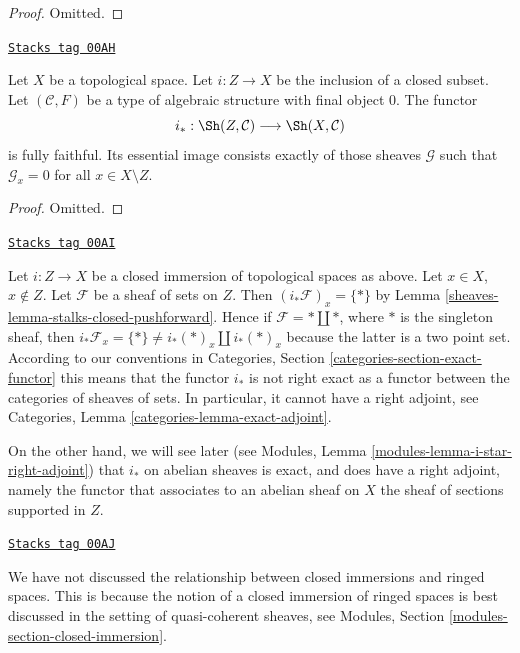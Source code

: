 \begin{proof}
Omitted.
\end{proof}

\begin{lemma}
\label{sheaves-lemma-equivalence-categories-closed-structures}
\href{https://stacks.math.columbia.edu/tag/00AH}{\texttt{Stacks tag 00AH}}

Let $X$ be a topological space.
Let $i : Z \to X$ be the inclusion of a closed subset.
Let $(\mathcal{C}, F)$ be a type of algebraic structure
with final object $0$. The functor
$$
i_* : \Sh(Z, \mathcal{C}) \longrightarrow \Sh(X, \mathcal{C})
$$
is fully faithful. Its essential image consists exactly
of those sheaves $\mathcal{G}$ such that
$\mathcal{G}_x = 0$ for all $x \in X \setminus Z$.
\end{lemma}

\begin{proof}
Omitted.
\end{proof}

\begin{remark}
\label{sheaves-remark-i-star-not-exact}
\href{https://stacks.math.columbia.edu/tag/00AI}{\texttt{Stacks tag 00AI}}

Let $i : Z \to X$ be a closed immersion of topological spaces as above.
Let $x \in X$, $x \not \in Z$. Let $\mathcal{F}$ be a sheaf of sets
on $Z$. Then $(i_*\mathcal{F})_x = \{ * \}$
by Lemma \ref{sheaves-lemma-stalks-closed-pushforward}.
Hence if $\mathcal{F} = * \amalg *$, where
$*$ is the singleton sheaf, then
$i_*\mathcal{F}_x = \{*\} \not = i_*(*)_x \amalg i_*(*)_x$
because the latter is a two point set.
According to our conventions in
Categories, Section \ref{categories-section-exact-functor}
this means that the functor $i_*$ is not right exact
as a functor between the categories of sheaves of sets.
In particular, it cannot have a right adjoint, see
Categories, Lemma \ref{categories-lemma-exact-adjoint}.

\medskip\noindent
On the other hand, we will see later (see
Modules, Lemma \ref{modules-lemma-i-star-right-adjoint})
that $i_*$ on abelian sheaves is exact, and does have a right
adjoint, namely the functor that associates to an abelian sheaf on $X$
the sheaf of sections supported in $Z$.
\end{remark}

\begin{remark}
\label{sheaves-remark-closed-immersion-spaces}
\href{https://stacks.math.columbia.edu/tag/00AJ}{\texttt{Stacks tag 00AJ}}

We have not discussed the relationship between closed immersions
and ringed spaces. This is because the notion of a closed immersion
of ringed spaces is best discussed in the setting of quasi-coherent
sheaves, see Modules, Section \ref{modules-section-closed-immersion}.
\end{remark}

